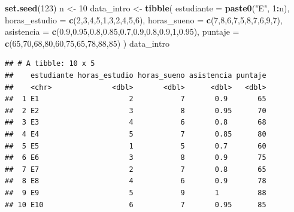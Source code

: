 \documentclass[
]{book}
\newenvironment{Shaded}{\begin{snugshade}}{\end{snugshade}}
\newcommand{\AttributeTok}[1]{\textcolor[rgb]{0.13,0.29,0.53}{#1}}
\newcommand{\DecValTok}[1]{\textcolor[rgb]{0.00,0.00,0.81}{#1}}
\newcommand{\FloatTok}[1]{\textcolor[rgb]{0.00,0.00,0.81}{#1}}
\newcommand{\FunctionTok}[1]{\textcolor[rgb]{0.13,0.29,0.53}{\textbf{#1}}}
\newcommand{\NormalTok}[1]{#1}
\newcommand{\OtherTok}[1]{\textcolor[rgb]{0.56,0.35,0.01}{#1}}
\newcommand{\SpecialCharTok}[1]{\textcolor[rgb]{0.81,0.36,0.00}{\textbf{#1}}}
\newcommand{\StringTok}[1]{\textcolor[rgb]{0.31,0.60,0.02}{#1}}
\begin{document}
\begin{Shaded}
\begin{Highlighting}[]
\FunctionTok{set.seed}\NormalTok{(}\DecValTok{123}\NormalTok{)}
\NormalTok{n }\OtherTok{\textless{}{-}} \DecValTok{10}
\NormalTok{data\_intro }\OtherTok{\textless{}{-}} \FunctionTok{tibble}\NormalTok{(}
  \AttributeTok{estudiante =} \FunctionTok{paste0}\NormalTok{(}\StringTok{"E"}\NormalTok{, }\DecValTok{1}\SpecialCharTok{:}\NormalTok{n),}
  \AttributeTok{horas\_estudio =} \FunctionTok{c}\NormalTok{(}\DecValTok{2}\NormalTok{,}\DecValTok{3}\NormalTok{,}\DecValTok{4}\NormalTok{,}\DecValTok{5}\NormalTok{,}\DecValTok{1}\NormalTok{,}\DecValTok{3}\NormalTok{,}\DecValTok{2}\NormalTok{,}\DecValTok{4}\NormalTok{,}\DecValTok{5}\NormalTok{,}\DecValTok{6}\NormalTok{),}
  \AttributeTok{horas\_sueno  =} \FunctionTok{c}\NormalTok{(}\DecValTok{7}\NormalTok{,}\DecValTok{8}\NormalTok{,}\DecValTok{6}\NormalTok{,}\DecValTok{7}\NormalTok{,}\DecValTok{5}\NormalTok{,}\DecValTok{8}\NormalTok{,}\DecValTok{7}\NormalTok{,}\DecValTok{6}\NormalTok{,}\DecValTok{9}\NormalTok{,}\DecValTok{7}\NormalTok{),}
  \AttributeTok{asistencia   =} \FunctionTok{c}\NormalTok{(}\FloatTok{0.9}\NormalTok{,}\FloatTok{0.95}\NormalTok{,}\FloatTok{0.8}\NormalTok{,}\FloatTok{0.85}\NormalTok{,}\FloatTok{0.7}\NormalTok{,}\FloatTok{0.9}\NormalTok{,}\FloatTok{0.8}\NormalTok{,}\FloatTok{0.9}\NormalTok{,}\DecValTok{1}\NormalTok{,}\FloatTok{0.95}\NormalTok{),}
  \AttributeTok{puntaje      =} \FunctionTok{c}\NormalTok{(}\DecValTok{65}\NormalTok{,}\DecValTok{70}\NormalTok{,}\DecValTok{68}\NormalTok{,}\DecValTok{80}\NormalTok{,}\DecValTok{60}\NormalTok{,}\DecValTok{75}\NormalTok{,}\DecValTok{65}\NormalTok{,}\DecValTok{78}\NormalTok{,}\DecValTok{88}\NormalTok{,}\DecValTok{85}\NormalTok{)}
\NormalTok{)}
\NormalTok{data\_intro}
\end{Highlighting}
\end{Shaded}

\begin{verbatim}
## # A tibble: 10 x 5
##    estudiante horas_estudio horas_sueno asistencia puntaje
##    <chr>              <dbl>       <dbl>      <dbl>   <dbl>
##  1 E1                     2           7       0.9       65
##  2 E2                     3           8       0.95      70
##  3 E3                     4           6       0.8       68
##  4 E4                     5           7       0.85      80
##  5 E5                     1           5       0.7       60
##  6 E6                     3           8       0.9       75
##  7 E7                     2           7       0.8       65
##  8 E8                     4           6       0.9       78
##  9 E9                     5           9       1         88
## 10 E10                    6           7       0.95      85
\end{verbatim}
\end{document}
